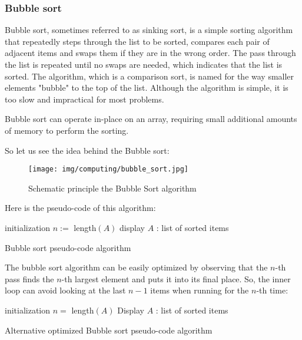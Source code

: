 	\subsubsection{Bubble sort}
	Bubble sort, sometimes referred to as sinking sort, is a simple sorting algorithm that repeatedly steps through the list to be sorted, compares each pair of adjacent items and swaps them if they are in the wrong order. The pass through the list is repeated until no swaps are needed, which indicates that the list is sorted. The algorithm, which is a comparison sort, is named for the way smaller elements "bubble" to the top of the list. Although the algorithm is simple, it is too slow and impractical for most problems.
	
	Bubble sort can operate in-place on an array, requiring small additional amounts of memory to perform the sorting.
	
	So let us see the idea behind the Bubble sort:
	\begin{figure}[H]
		\centering
		\texttt{[image: img/computing/bubble\_sort.jpg]}
		\caption{Schematic principle the Bubble Sort algorithm}
	\end{figure}
	
	Here is the pseudo-code of this algorithm:
	
	\begin{algorithm}[H]
	 initialization\;
	 $n :=$ length$(A)$\;
	 \nl{}
	display $A$ : list of sorted items\;
	 \caption{Bubble sort pseudo-code algorithm}
	\end{algorithm}
	The bubble sort algorithm can be easily optimized by observing that the $n$-th pass finds the $n$-th largest element and puts it into its final place. So, the inner loop can avoid looking at the last $n-1$ items when running for the $n$-th time:
	
	\begin{algorithm}[H]
	 initialization\;
	 $n =$ length$(A)$\;
	 \nl{}
	Display $A$ : list of sorted items\;
	 \caption{Alternative optimized Bubble sort pseudo-code algorithm}
	\end{algorithm}

